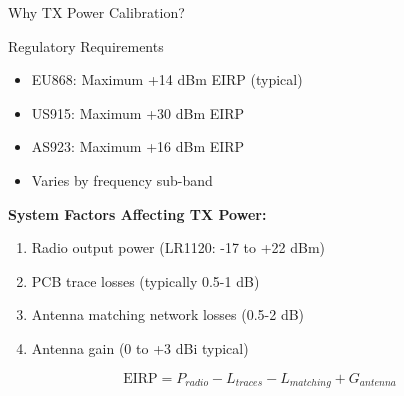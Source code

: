 \documentclass{beamer}
\begin{document}
\begin{frame}{Why TX Power Calibration?}
\begin{block}{Regulatory Requirements}
\begin{itemize}
    \item EU868: Maximum +14 dBm EIRP (typical)
    \item US915: Maximum +30 dBm EIRP
    \item AS923: Maximum +16 dBm EIRP
    \item Varies by frequency sub-band
\end{itemize}
\end{block}

\vspace{0.3cm}

\textbf{System Factors Affecting TX Power:}
\begin{enumerate}
    \item Radio output power (LR1120: -17 to +22 dBm)
    \item PCB trace losses (typically 0.5-1 dB)
    \item Antenna matching network losses (0.5-2 dB)
    \item Antenna gain (0 to +3 dBi typical)
\end{enumerate}

\vspace{0.3cm}

\[
\text{EIRP} = P_{radio} - L_{traces} - L_{matching} + G_{antenna}
\]
\end{frame}
\end{document}
